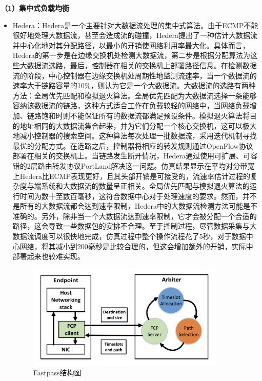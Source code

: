 \textbf{（1）集中式负载均衡}
\begin{itemize}
    \item Hedera\cite{fares2010hedera}：Hedera是一个主要针对大数据流处理的集中式算法。由于ECMP不能很好地处理大数据流，甚至会造成流的碰撞，Hedera提出了一种估计大数据流并中心化地对其分配路径，以最小的开销使网络利用率最大化。具体而言，Hedera的第一步是在边缘交换机处检测大数据流，第二步是根据分配算法为这些大数据流选路，最后，控制器在相关的交换机上部署路径信息。在检测数据流的阶段，中心控制器在边缘交换机处周期性地监测流速率，当一个数据流的速率大于链路容量的10\%，则认为它是一个大数据流。大数据流的选路有两种方法：全局优先匹配和模拟退火算法。全局优先匹配为大数据流选择一条能够容纳该数据流的链路，这种方式适合工作在负载较轻的网络中，当网络负载增加、链路饱和时则不能保证所有的数据流都满足预设条件。模拟退火算法将目的地址相同的大数据流集合起来，并为它们分配一个核心交换机，这可以极大地减小控制器的搜索空间。这种算法每次处理一批数据流，采用迭代机制寻找最优的分配方式。在选路之后，控制器将相应的转发规则通过OpenFlow协议部署在相关的交换机上。当链路发生断开情况，Hedera通过使用可扩展、可容错的2层路由转发协议PortLand\cite{mysore2009Portland}解决这一问题。仿真结果显示在平均对分带宽上Hedera比ECMP表现更好，且其头部开销是可接受的，流速率估计过程的复杂度与端系统和大数据流的数量呈正相关。全局优先匹配与模拟退火算法的运行时间为数十至数百毫秒，这符合数据中心对于处理速度的要求。然而，并不是所有的大数据流都会达到速率限制，Hedera中的大数据流检测方法可能是不准确的。另外，除非当一个大数据流达到速率限制，它才会被分配一个合适的路径，这会导致一些数据包的安排不合理。至于控制过程，尽管数据采集与大数据流调度可以很快地完成，仿真过程中整个操作流程花了5秒，对于数据中心网络，将其减小到200毫秒是比较合理的，但这会增加额外的开销，实际中部署起来也较难实现。
\begin{figure}[ht]
    \centering
    \includegraphics[height=5cm]{figure/Fastpass.png}
    \caption{Fastpass结构图}
    \label{fig:Fastpass}
\end{figure}

\end{itemize}
